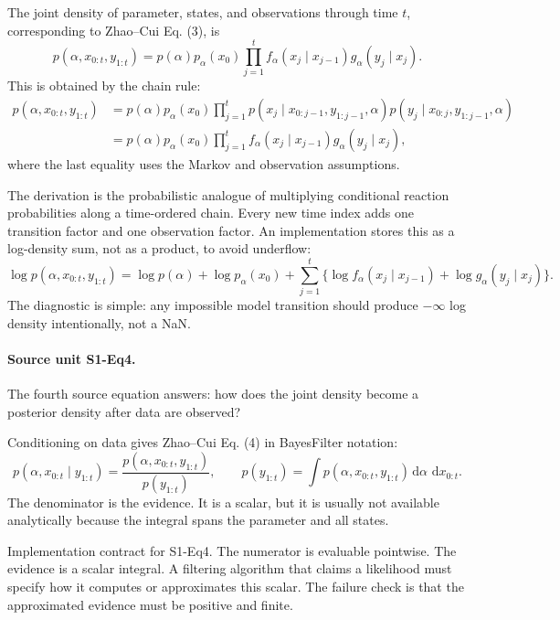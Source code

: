 \documentclass[11pt]{article}
\newcommand{\dd}{\,\mathrm d}
\begin{document}
The joint density of parameter, states, and observations through time \(t\),
corresponding to Zhao--Cui Eq. (3), is
\[
    p(\alpha,x_{0:t},y_{1:t})
    =
    p(\alpha)p_\alpha(x_0)
    \prod_{j=1}^{t}
    f_\alpha(x_j\mid x_{j-1})g_\alpha(y_j\mid x_j).
    \tag{BF-3}
\]
This is obtained by the chain rule:
\[
\begin{aligned}
 p(\alpha,x_{0:t},y_{1:t})
 &=
 p(\alpha)p_\alpha(x_0)
 \prod_{j=1}^t
 p(x_j\mid x_{0:j-1},y_{1:j-1},\alpha)
 p(y_j\mid x_{0:j},y_{1:j-1},\alpha)\\
 &=
 p(\alpha)p_\alpha(x_0)
 \prod_{j=1}^t
 f_\alpha(x_j\mid x_{j-1})g_\alpha(y_j\mid x_j),
\end{aligned}
\]
where the last equality uses the Markov and observation assumptions.

The derivation is the probabilistic analogue of multiplying conditional
reaction probabilities along a time-ordered chain.  Every new time index adds
one transition factor and one observation factor.  An implementation stores
this as a log-density sum, not as a product, to avoid underflow:
\[
    \log p(\alpha,x_{0:t},y_{1:t})
    =
    \log p(\alpha)+\log p_\alpha(x_0)
    +
    \sum_{j=1}^t
    \{\log f_\alpha(x_j\mid x_{j-1})+\log g_\alpha(y_j\mid x_j)\}.
    \tag{BF-3a}
\]
The diagnostic is simple: any impossible model transition should produce
\(-\infty\) log density intentionally, not a NaN.

\paragraph{Source unit S1-Eq4.}
The fourth source equation answers: how does the joint density become a
posterior density after data are observed?

Conditioning on data gives Zhao--Cui Eq. (4) in BayesFilter notation:
\[
    p(\alpha,x_{0:t}\mid y_{1:t})
    =
    \frac{p(\alpha,x_{0:t},y_{1:t})}
    {p(y_{1:t})},
    \qquad
    p(y_{1:t})
    =
    \int p(\alpha,x_{0:t},y_{1:t})
    \dd\alpha\,\dd x_{0:t}.
    \tag{BF-4}
\]
The denominator is the evidence.  It is a scalar, but it is usually not
available analytically because the integral spans the parameter and all states.

Implementation contract for S1-Eq4.  The numerator is evaluable pointwise.  The
evidence is a scalar integral.  A filtering algorithm that claims a likelihood
must specify how it computes or approximates this scalar.  The failure check is
that the approximated evidence must be positive and finite.
\end{document}
